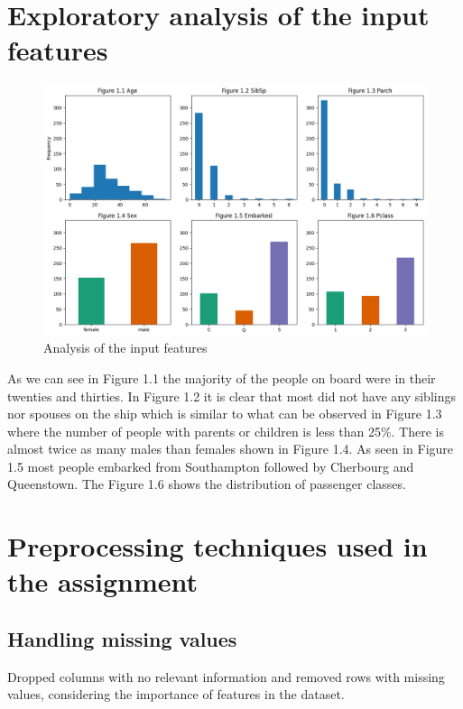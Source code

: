 \documentclass{article}
\begin{document}
\section{Exploratory analysis of the input features}

\begin{figure}[H]
    \centering
    \includegraphics[width=1\linewidth]{input_features.png}
    \caption{Analysis of the input features}
    \label{fig:Analysis of the input features}
\end{figure}

As we can see in Figure 1.1 the majority of the people on board were in their twenties and thirties. In Figure 1.2 it is clear that most did not have any siblings nor spouses on the ship which is similar to what can be observed in Figure 1.3 where the number of people with parents or children is less than 25\%. There is almost twice as many males than females shown in Figure 1.4. As seen in Figure 1.5 most people embarked from Southampton followed by Cherbourg and Queenstown. The Figure 1.6 shows the distribution of passenger classes.

\section{Preprocessing techniques used in the assignment}

\subsection{Handling missing values}

Dropped columns with no relevant information and removed rows with missing values, considering the importance of features in the dataset.
\end{document}
